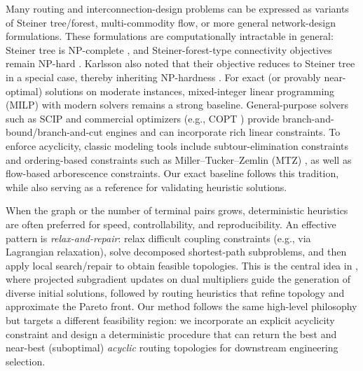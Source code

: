 Many routing and interconnection-design problems can be expressed as variants of Steiner tree/forest, multi-commodity flow, or more general network-design formulations.
These formulations are computationally intractable in general: Steiner tree is NP-complete \cite{garey1979computers}, and Steiner-forest-type connectivity objectives remain NP-hard \cite{goemans1995primal}.
Karlsson \etal{} also noted that their objective reduces to Steiner tree in a special case, thereby inheriting NP-hardness \cite{karlsson2024cad}.
For exact (or provably near-optimal) solutions on moderate instances, mixed-integer linear programming (MILP) with modern solvers remains a strong baseline.
General-purpose solvers such as SCIP \cite{achterberg2009scip} and commercial optimizers (e.g., COPT \cite{copt2024}) provide branch-and-bound/branch-and-cut engines and can incorporate rich linear constraints.
To enforce acyclicity, classic modeling tools include subtour-elimination constraints and ordering-based constraints such as Miller--Tucker--Zemlin (MTZ) \cite{miller1960integer}, as well as flow-based arborescence constraints.
Our exact baseline follows this tradition, while also serving as a reference for validating heuristic solutions.

When the graph or the number of terminal pairs grows, deterministic heuristics are often preferred for speed, controllability, and reproducibility.
An effective pattern is \emph{relax-and-repair}: relax difficult coupling constraints (e.g., via Lagrangian relaxation), solve decomposed shortest-path subproblems, and then apply local search/repair to obtain feasible topologies.
This is the central idea in \cite{karlsson2024cad}, where projected subgradient updates on dual multipliers guide the generation of diverse initial solutions, followed by routing heuristics that refine topology and approximate the Pareto front.
Our method follows the same high-level philosophy but targets a different feasibility region: we incorporate an explicit acyclicity constraint and design a deterministic procedure that can return the best and near-best (suboptimal) \emph{acyclic} routing topologies for downstream engineering selection.

